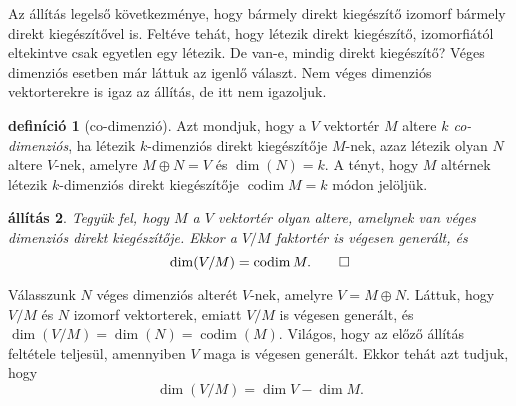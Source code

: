 \documentclass[a4paper, showtrims]{memoir}
\makeatletter
\renewenvironment{proof}[1][\proofname]
    {\par\pushQED{\qed}%
    \normalfont \topsep6\p@\@plus6\p@\relax
    \trivlist
    \item[\hskip\labelsep
        \itshape
    #1\@addpunct{:}]\ignorespaces}
    {\popQED\endtrivlist\@endpefalse}
\theoremstyle{plain}
\newtheorem{proposition}{állítás}[chapter]
\theoremstyle{remark}
\theoremstyle{definition}
\newtheorem{definition}[proposition]{definíció}
\DeclareMathOperator{\codim}{codim}
\makeatother
\begin{document}
Az állítás legelső következménye,
hogy bármely direkt kiegészítő izomorf bármely direkt kiegészítővel is.
Feltéve tehát, hogy létezik direkt kiegészítő,
izomorfiától eltekintve csak egyetlen egy létezik.
De van-e, mindig direkt kiegészítő?
Véges dimenziós esetben már láttuk az igenlő választ.
Nem véges dimenziós vektorterekre is igaz az állítás, de itt nem igazoljuk.
\begin{definition}[co-dimenzió]
	Azt mondjuk, hogy a $V$ vektortér $M$ altere \emph{$k$ co-dimenziós},
	ha létezik $k$-dimenziós direkt kiegészítője $M$-nek,
	azaz létezik olyan $N$ altere $V$-nek, amelyre $M\oplus N=V$
	és $\dim(N)=k$.
	A tényt,
	hogy $M$ altérnek létezik $k$-dimenziós direkt kiegészítője
	$\codim M=k$ módon jelöljük.
\end{definition}
\begin{proposition}
	Tegyük fel, hogy $M$ a $V$ vektortér olyan altere,
	amelynek van véges dimenziós direkt kiegészítője.
	Ekkor a $V/M$ faktortér is végesen generált, és
	\[
		\dim(V/M)
        =
		\codim M.
        \qedhere
	\]
\end{proposition}
\begin{proof}
	Válasszunk $N$ véges dimenziós alterét $V$-nek,
	amelyre $V=M\oplus N$.
	Láttuk, hogy $V/M$ és $N$ izomorf vektorterek,
	emiatt $V/M$ is végesen generált, és
	$\dim \left( V/M \right)=\dim(N)=\codim(M)$.
\end{proof}
Világos, hogy az előző állítás feltétele teljesül, amennyiben $V$ maga is végesen generált.
Ekkor tehát azt tudjuk, hogy
\[
    \dim (V/M)=\dim V-\dim M.
\]
\end{document}
